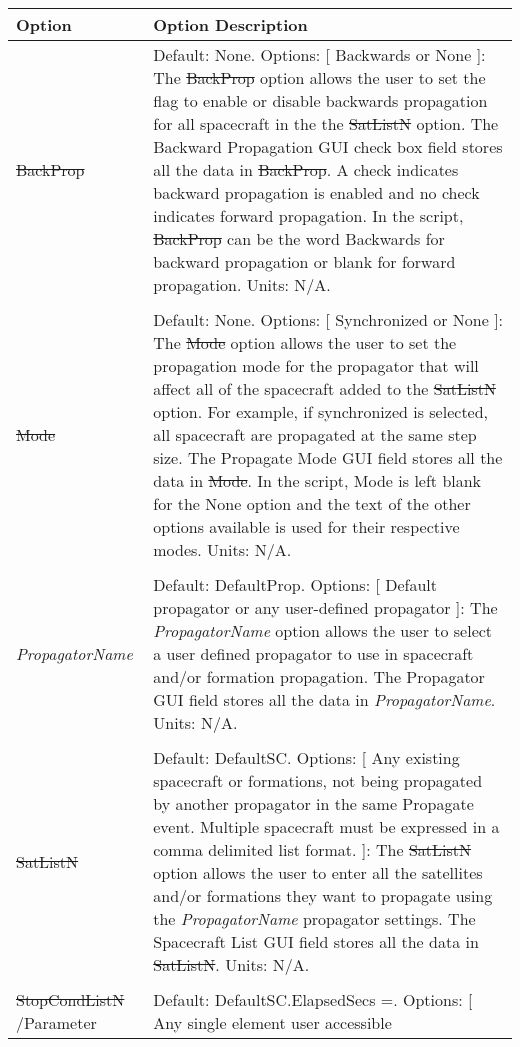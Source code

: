 \begin{supertabular*}{6.5 in}{@{}p{1.0 in}@{\extracolsep{\fill}}p{5.0 in}@{}}
    \hline\hline
    Option & Option Description\\
    \hline
    \st{BackProp} & Default: None. Options: [ Backwards or None ]:
    The \st{BackProp} option allows the user to set the flag to enable or disable backwards propagation for all
    spacecraft in the the \st{SatListN} option.
    The Backward Propagation GUI check box field stores all the data in \st{BackProp}. A check indicates backward
    propagation is enabled and no check indicates forward propagation. In the script, \st{BackProp} can be the word
    Backwards for backward propagation or blank for forward propagation. Units: N/A.
    \\\\
    \st{Mode} & Default: None.  Options: [ Synchronized or None ]:
    The \st{Mode} option allows the user to set the propagation mode for the propagator that will affect all of the
    spacecraft added to the \st{SatListN} option. For example, if synchronized is selected, all spacecraft are
    propagated at the same step size. The Propagate Mode GUI field stores all the data in \st{Mode}. In the script,
    Mode is left blank for the None option and the text of the other options available is used for their respective
    modes. Units: N/A. \\\\
    \emph{PropagatorName} & Default: DefaultProp. Options: [ Default propagator or any user-defined propagator ]:
    The \emph{PropagatorName} option allows the user to select a user defined propagator to use in spacecraft and/or
    formation propagation. The Propagator GUI field stores all the data in \emph{PropagatorName}. Units: N/A.\\\\
    \st{SatListN} & Default: DefaultSC. Options: [ Any existing spacecraft or
    formations, not being propagated by another propagator in the same Propagate event.  Multiple spacecraft must be
    expressed in a comma delimited list format. ]: The \st{SatListN} option allows the user to enter all the
    satellites and/or formations they want to propagate using the \emph{PropagatorName} propagator settings.
    The Spacecraft List GUI field stores all the data in \st{SatListN}. Units: N/A.\\\\
    \st{StopCondListN} /Parameter & Default: DefaultSC.ElapsedSecs =. Options: [ Any single element user accessible

\end{supertabular*}
